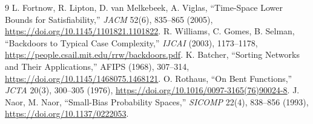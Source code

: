 \documentclass[11pt]{article}
\begin{document}
\begin{thebibliography}{9}
 L. Fortnow, R. Lipton, D. van Melkebeek, A. Viglas,
``Time-Space Lower Bounds for Satisfiability,'' \emph{JACM} 52(6), 835--865
(2005), \url{https://doi.org/10.1145/1101821.1101822}.
 R. Williams, C. Gomes, B. Selman, ``Backdoors to Typical
Case Complexity,'' \emph{IJCAI} (2003), 1173--1178,
\url{https://people.csail.mit.edu/rrw/backdoors.pdf}.
 K. Batcher, ``Sorting Networks and Their Applications,''
AFIPS (1968), 307--314, \url{https://doi.org/10.1145/1468075.1468121}.
 O. Rothaus, ``On Bent Functions,'' \emph{JCTA} 20(3),
300--305 (1976), \url{https://doi.org/10.1016/0097-3165(76)90024-8}.
 J. Naor, M. Naor, ``Small-Bias Probability Spaces,''
\emph{SICOMP} 22(4), 838--856 (1993),
\url{https://doi.org/10.1137/0222053}.
\end{thebibliography}
\end{document}
